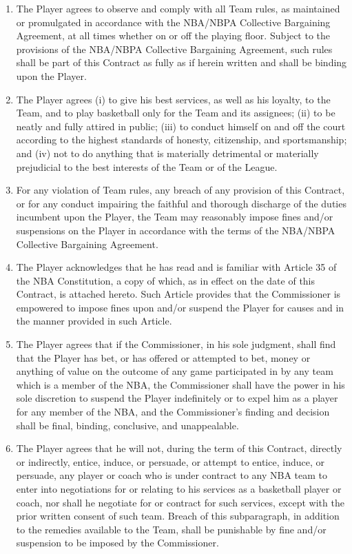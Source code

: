 \documentclass[
]{book}
\providecommand{\tightlist}{%
  \setlength{\itemsep}{0pt}\setlength{\parskip}{0pt}}
\begin{document}
\begin{enumerate}
  \begin{enumerate}
  \def\labelenumii{(\alph{enumii})}
  \tightlist
  \item
    The Player agrees to observe and comply with all Team rules, as maintained or promulgated in accordance with the NBA/NBPA Collective Bargaining Agreement, at all times whether on or off the playing floor. Subject to the provisions of the NBA/NBPA Collective Bargaining Agreement, such rules shall be part of this Contract as fully as if herein written and shall be binding upon the Player.
  \item
    The Player agrees (i) to give his best services, as well as his loyalty, to the Team, and to play basketball only for the Team and its assignees; (ii) to be neatly and fully attired in public; (iii) to conduct himself on and off the court according to the highest standards of honesty, citizenship, and sportsmanship; and (iv) not to do anything that is materially detrimental or materially prejudicial to the best interests of the Team or of the League.
  \item
    For any violation of Team rules, any breach of any provision of this Contract, or for any conduct impairing the faithful and thorough discharge of the duties incumbent upon the Player, the Team may reasonably impose fines and/or suspensions on the Player in accordance with the terms of the NBA/NBPA Collective Bargaining Agreement.
  \item
    The Player acknowledges that he has read and is familiar with Article 35 of the NBA Constitution, a copy of which, as in effect on the date of this Contract, is attached hereto. Such Article provides that the Commissioner is empowered to impose fines upon and/or suspend the Player for causes and in the manner provided in such Article.
  \item
    The Player agrees that if the Commissioner, in his sole judgment, shall find that the Player has bet, or has offered or attempted to bet, money or anything of value on the outcome of any game participated in by any team which is a member of the NBA, the Commissioner shall have the power in his sole discretion to suspend the Player indefinitely or to expel him as a player for any member of the NBA, and the Commissioner's finding and decision shall be final, binding, conclusive, and unappealable.
  \item
    The Player agrees that he will not, during the term of this Contract, directly or indirectly, entice, induce, or persuade, or attempt to entice, induce, or persuade, any player or coach who is under contract to any NBA team to enter into negotiations for or relating to his services as a basketball player or coach, nor shall he negotiate for or contract for such services, except with the prior written consent of such team. Breach of this subparagraph, in addition to the remedies available to the Team, shall be punishable by fine and/or suspension to be imposed by the Commissioner.

\end{enumerate}
\end{enumerate}
\end{document}
